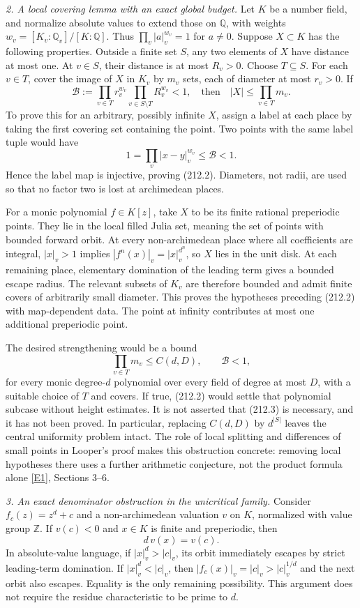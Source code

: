 \documentclass[11pt,a4paper]{article}
\newcommand{\Z}{\mathbb{Z}}
\newcommand{\Q}{\mathbb{Q}}
\newcommand{\eref}[2]{\hyperlink{extra:#1:#2}{[E#2]}}
\begin{document}
\textit{2. A local covering lemma with an exact global budget.}
Let $K$ be a number field, and normalize absolute values to extend those on
$\Q$, with weights $w_v=[K_v:\Q_v]/[K:\Q]$. Thus
$\prod_v|a|_v^{w_v}=1$ for $a\ne0$. Suppose $X\subset K$ has the following
properties. Outside a finite set $S$, any two elements of $X$ have distance
at most one. At $v\in S$, their distance is at most $R_v>0$. Choose
$T\subseteq S$. For each $v\in T$, cover the image of $X$ in $K_v$ by
$m_v$ sets, each of diameter at most $r_v>0$. If
\[
 \mathcal B:=\prod_{v\in T}r_v^{w_v}
             \prod_{v\in S\setminus T}R_v^{w_v}<1,
 \quad\text{then}\quad |X|\le\prod_{v\in T}m_v.                 \tag{212.2}
\]
To prove this for an arbitrary, possibly infinite $X$, assign a label at
each place by taking the first covering set containing the point. Two
points with the same label tuple would have
\[
 1=\prod_v|x-y|_v^{w_v}\le\mathcal B<1.
\]
Hence the label map is injective, proving (212.2). Diameters, not radii,
are used so that no factor two is lost at archimedean places.

For a monic polynomial $f\in K[z]$, take $X$ to be its finite rational
preperiodic points. They lie in the local filled Julia set, meaning the set
of points with bounded forward orbit. At every non-archimedean place where
all coefficients are integral, $|x|_v>1$ implies
$|f^n(x)|_v=|x|_v^{d^n}$, so $X$ lies in the unit disk. At each remaining
place, elementary domination of the leading term gives a bounded escape
radius. The relevant subsets of $K_v$ are therefore bounded and admit finite
covers of arbitrarily small diameter. This proves the hypotheses preceding
(212.2) with map-dependent data. The point at infinity contributes at most
one additional preperiodic point.

The desired strengthening would be a bound
\[
 \prod_{v\in T}m_v\le C(d,D),\qquad\mathcal B<1,                \tag{212.3}
\]
for every monic degree-$d$ polynomial over every field of degree at most
$D$, with a suitable choice of $T$ and covers. If true, (212.2) would settle
that polynomial subcase without height estimates. It is not asserted that
(212.3) is necessary, and it has not been proved. In particular, replacing
$C(d,D)$ by $d^{|S|}$ leaves the central uniformity problem intact. The role
of local splitting and differences of small points in Looper's proof makes
this obstruction concrete: removing local hypotheses there uses a further
arithmetic conjecture, not the product formula alone \eref{212}{1},
Sections 3--6.

\textit{3. An exact denominator obstruction in the unicritical family.}
Consider $f_c(z)=z^d+c$ and a non-archimedean valuation $v$ on $K$, normalized
with value group $\Z$. If $v(c)<0$ and $x\in K$ is finite and preperiodic,
then
\[
 d\,v(x)=v(c).                                                \tag{212.4}
\]
In absolute-value language, if $|x|_v^d>|c|_v$, its orbit immediately escapes
by strict leading-term domination. If $|x|_v^d<|c|_v$, then
$|f_c(x)|_v=|c|_v>|c|_v^{1/d}$ and the next orbit also escapes. Equality is
the only remaining possibility. This argument does not require the residue
characteristic to be prime to $d$.
\end{document}
